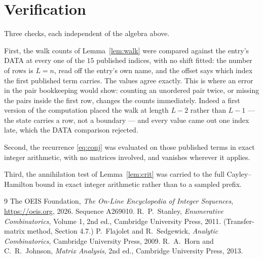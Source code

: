 \documentclass[11pt,a4paper]{article}
\theoremstyle{plain}
\theoremstyle{definition}
\begin{document}
\section{Verification}

Three checks, each independent of the algebra above.

First, the walk counts of Lemma~\ref{lem:walk} were compared against the entry's DATA at
every one of the $15$ published indices, with no shift fitted: the number of rows is
$L=n$, read off the entry's own name, and the offset says which index the first
published term carries. The values agree exactly. This is where an error in the pair
bookkeeping would show: counting an unordered pair twice, or missing the pairs inside the
first row, changes the counts immediately. Indeed a first version of the computation
placed the walk at length $L-2$ rather than $L-1$ --- the state carries a row, not a
boundary --- and every value came out one index late, which the DATA comparison rejected.

Second, the recurrence \eqref{eq:conj} was evaluated on those published terms in exact
integer arithmetic, with no matrices involved, and vanishes wherever it applies.

Third, the annihilation test of Lemma~\ref{lem:crit} was carried to the full
Cayley--Hamilton bound in exact integer arithmetic rather than to a sampled prefix.

\begin{thebibliography}{9}
 The OEIS Foundation, \emph{The On-Line Encyclopedia of Integer
Sequences}, \url{https://oeis.org}, 2026. Sequence A269010.
 R.~P.~Stanley, \emph{Enumerative Combinatorics}, Volume 1, 2nd ed.,
Cambridge University Press, 2011. (Transfer-matrix method, Section 4.7.)
 P.~Flajolet and R.~Sedgewick, \emph{Analytic Combinatorics}, Cambridge
University Press, 2009.
 R.~A.~Horn and C.~R.~Johnson, \emph{Matrix Analysis}, 2nd ed., Cambridge
University Press, 2013.
\end{thebibliography}
\end{document}
